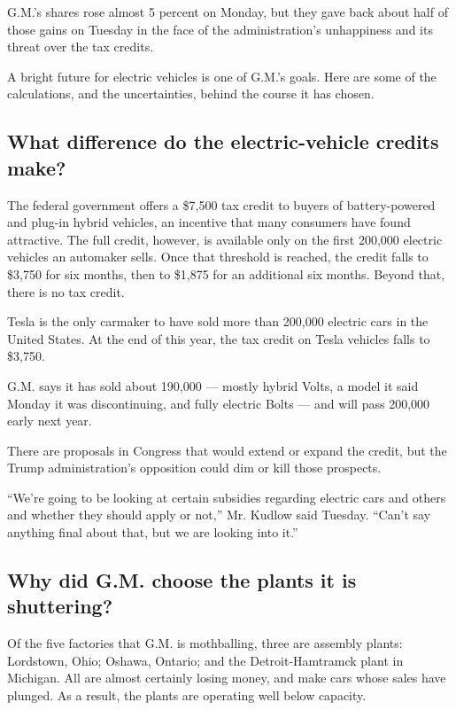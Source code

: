 G.M.'s shares rose almost 5 percent on Monday, but they gave back about
half of those gains on Tuesday in the face of the administration's
unhappiness and its threat over the tax credits.

A bright future for electric vehicles is one of G.M.'s goals. Here are
some of the calculations, and the uncertainties, behind the course it
has chosen.

\hypertarget{what-difference-do-the-electric-vehicle-credits-make}{%
\subsection{What difference do the electric-vehicle credits
make?}\label{what-difference-do-the-electric-vehicle-credits-make}}

The federal government offers a \$7,500 tax credit to buyers of
battery-powered and plug-in hybrid vehicles, an incentive that many
consumers have found attractive. The full credit, however, is available
only on the first 200,000 electric vehicles an automaker sells. Once
that threshold is reached, the credit falls to \$3,750 for six months,
then to \$1,875 for an additional six months. Beyond that, there is no
tax credit.

Tesla is the only carmaker to have sold more than 200,000 electric cars
in the United States. At the end of this year, the tax credit on Tesla
vehicles falls to \$3,750.

G.M. says it has sold about 190,000 --- mostly hybrid Volts, a model it
said Monday it was discontinuing, and fully electric Bolts --- and will
pass 200,000 early next year.

There are proposals in Congress that would extend or expand the credit,
but the Trump administration's opposition could dim or kill those
prospects.

``We're going to be looking at certain subsidies regarding electric cars
and others and whether they should apply or not,'' Mr. Kudlow said
Tuesday. ``Can't say anything final about that, but we are looking into
it.''

\hypertarget{why-did-gm-choose-the-plants-it-is-shuttering}{%
\subsection{Why did G.M. choose the plants it is
shuttering?}\label{why-did-gm-choose-the-plants-it-is-shuttering}}

Of the five factories that G.M. is mothballing, three are assembly
plants: Lordstown, Ohio; Oshawa, Ontario; and the Detroit-Hamtramck
plant in Michigan. All are almost certainly losing money, and make cars
whose sales have plunged. As a result, the plants are operating well
below capacity.


